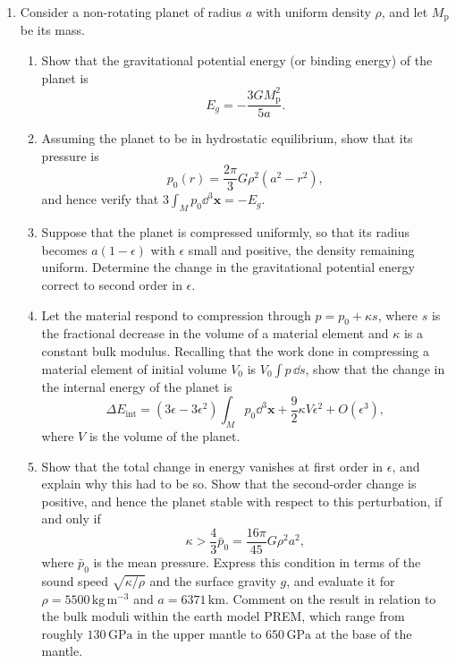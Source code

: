 \begin{enumerate}
\item Consider a non-rotating planet of radius $a$ with uniform density $\rho$, and let $M_{\mathrm{p}}$ be its mass.
\begin{enumerate}
\item Show that the gravitational potential energy (or binding energy) of the planet is
\begin{equation*}
    E_{g}=-\frac{3GM_{\mathrm{p}}^{2}}{5a}.
\end{equation*}
\item Assuming the planet to be in hydrostatic equilibrium, show that its pressure is
\begin{equation*}
    p_{0}(r)=\frac{2\pi}{3}G\rho^{2}(a^{2}-r^{2}),
\end{equation*}
and hence verify that $3\int_{M}p_{0}\dd^{3}\mathbf{x}=-E_{g}$.
\item Suppose that the planet is compressed uniformly, so that its radius becomes $a(1-\epsilon)$ with $\epsilon$ small and positive,
the density remaining uniform. Determine the change in the gravitational potential energy correct to second order in $\epsilon$.
\item Let the material respond to compression through $p=p_{0}+\kappa s$, where $s$ is the fractional decrease in the volume of a
material element and $\kappa$ is a constant bulk modulus. Recalling that the work done in compressing a material element of initial
volume $V_{0}$ is $V_{0}\int p\,\dd s$, show that the change in the internal energy of the planet is
\begin{equation*}
    \Delta E_{\mathrm{int}}=(3\epsilon-3\epsilon^{2})\int_{M}p_{0}\dd^{3}\mathbf{x}+\frac{9}{2}\kappa V\epsilon^{2}+O(\epsilon^{3}),
\end{equation*}
where $V$ is the volume of the planet.
\item Show that the total change in energy vanishes at first order in $\epsilon$, and explain why this had to be so. Show that
the second-order change is positive, and hence the planet stable with respect to this perturbation, if and only if
\begin{equation*}
    \kappa>\frac{4}{3}\bar{p}_{0}=\frac{16\pi}{45}G\rho^{2}a^{2},
\end{equation*}
where $\bar{p}_{0}$ is the mean pressure. Express this condition in terms of the sound speed $\sqrt{\kappa/\rho}$ and the surface
gravity $g$, and evaluate it for $\rho=5500\,\mathrm{kg\,m^{-3}}$ and $a=6371\,\mathrm{km}$. Comment on the result in
relation to the bulk moduli within the earth model PREM, which range from roughly $130\,\mathrm{GPa}$ in the upper mantle to
$650\,\mathrm{GPa}$ at the base of the mantle.
\end{enumerate}


\end{enumerate}

